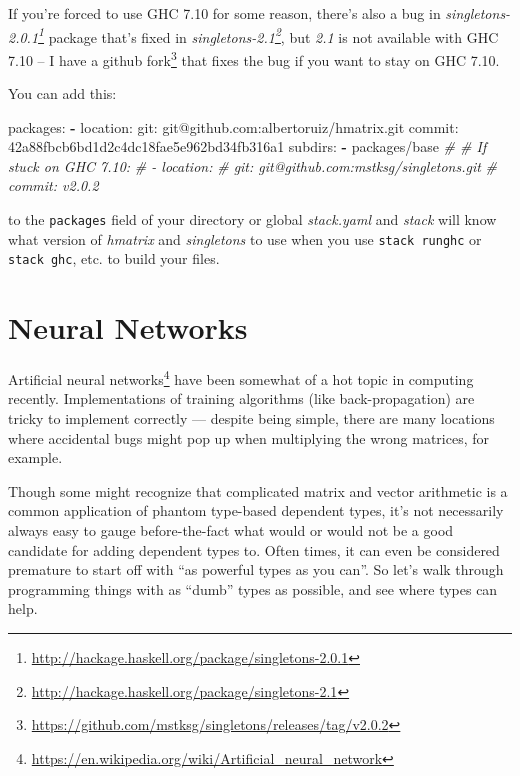 \documentclass[]{article}
\newenvironment{Shaded}{}{}
\newcommand{\KeywordTok}[1]{\textcolor[rgb]{0.00,0.44,0.13}{\textbf{{#1}}}}
\newcommand{\CommentTok}[1]{\textcolor[rgb]{0.38,0.63,0.69}{\textit{{#1}}}}
\newcommand{\FunctionTok}[1]{\textcolor[rgb]{0.02,0.16,0.49}{{#1}}}
\newcommand{\NormalTok}[1]{{#1}}
\renewcommand{\href}[2]{#2\footnote{\url{#1}}}
\begin{document}
If you're forced to use GHC 7.10 for some reason, there's also a bug in
\emph{\href{http://hackage.haskell.org/package/singletons-2.0.1}{singletons-2.0.1}}
package that's fixed in
\emph{\href{http://hackage.haskell.org/package/singletons-2.1}{singletons-2.1}},
but \emph{2.1} is not available with GHC 7.10 -- I have a
\href{https://github.com/mstksg/singletons/releases/tag/v2.0.2}{github fork}
that fixes the bug if you want to stay on GHC 7.10.

You can add this:

\begin{Shaded}
\begin{Highlighting}[]
\FunctionTok{packages:}
\KeywordTok{-} \FunctionTok{location:}
    \FunctionTok{git:} \NormalTok{git@github.com:albertoruiz/hmatrix.git}
    \FunctionTok{commit:} \NormalTok{42a88fbcb6bd1d2c4dc18fae5e962bd34fb316a1}
  \FunctionTok{subdirs:}
    \KeywordTok{-} \NormalTok{packages/base}
\CommentTok{# # If stuck on GHC 7.10:}
\CommentTok{# - location:}
\CommentTok{#     git: git@github.com:mstksg/singletons.git}
\CommentTok{#     commit: v2.0.2}
\end{Highlighting}
\end{Shaded}

to the \texttt{packages} field of your directory or global \emph{stack.yaml} and
\emph{stack} will know what version of \emph{hmatrix} and \emph{singletons} to
use when you use \texttt{stack\ runghc} or \texttt{stack\ ghc}, etc. to build
your files.

\section{Neural Networks}\label{neural-networks}

\href{https://en.wikipedia.org/wiki/Artificial_neural_network}{Artificial neural
networks} have been somewhat of a hot topic in computing recently.
Implementations of training algorithms (like back-propagation) are tricky to
implement correctly --- despite being simple, there are many locations where
accidental bugs might pop up when multiplying the wrong matrices, for example.

Though some might recognize that complicated matrix and vector arithmetic is a
common application of phantom type-based dependent types, it's not necessarily
always easy to gauge before-the-fact what would or would not be a good candidate
for adding dependent types to. Often times, it can even be considered premature
to start off with ``as powerful types as you can''. So let's walk through
programming things with as ``dumb'' types as possible, and see where types can
help.
\end{document}
